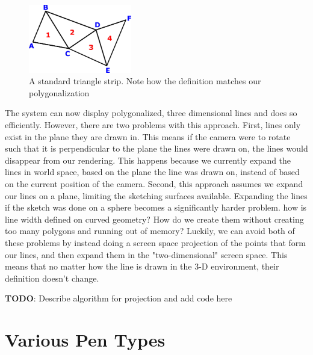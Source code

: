 \documentclass[12pt]{report}
\begin{document}
\begin{figure}
	\begin{center}
		\includegraphics[width=0.40\textwidth]{trianglestrip.png}
	\end{center}
	\caption{A standard triangle strip. Note how the definition matches our polygonalization}
\end{figure}

The system can now display polygonalized, three dimensional lines and does so efficiently.
However, there are two problems with this approach.
First, lines only exist in the plane they are drawn in.
This means if the camera were to rotate such that it is perpendicular to the plane the lines were drawn on, the lines would disappear from our rendering.
This happens because we currently expand the lines in world space, based on the  plane the line was drawn on, instead of based on the current position of the camera.
Second, this approach assumes we expand our lines on a plane, limiting the sketching surfaces available.
Expanding the lines if the sketch was done on a sphere becomes a significantly harder problem. how is line width defined on curved geometry? 
How do we create them without creating too many polygons and running out of memory?
Luckily, we can avoid both of these problems by instead doing a screen space projection of the points that form our lines, and then expand them in the "two-dimensional" screen space.
This means that no matter how the line is drawn in the 3-D environment, their definition doesn't change.

\noindent \textbf{TODO}: Describe algorithm for projection and add code here

\section{Various Pen Types}

 
\end{document}

